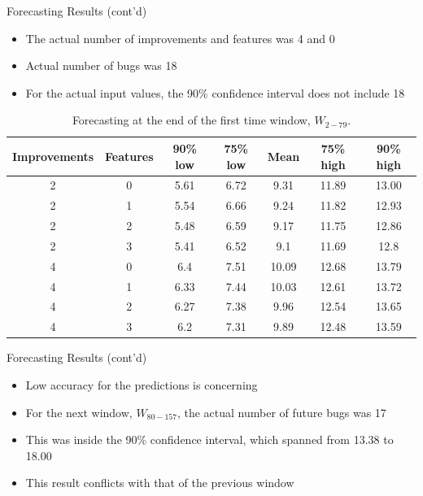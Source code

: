 \documentclass[presentation]{beamer}
\begin{document}
\begin{frame}[t]{Forecasting Results (cont'd)}
\footnotesize{
\begin{itemize}
\item{The actual number of improvements and features was 4 and 0}
\item{Actual number of bugs was 18}
\item{For the actual input values, the 90\% confidence interval does not include 18}
\end{itemize}

\vspace{-.5cm}
\begin{table}[htbp]
  \centering
\caption{Forecasting at the end of the first time window, $W_{2-79}$.}
  \begin{tabular}{ c | c | c | c | c | c | c }
    Improvements & Features & 90\% low & 75\% low & Mean & 75\% high & 90\% high \\
    \hline
2 & 0 & 5.61 & 6.72 & 9.31 & 11.89 & 13.00 \\
2 & 1 & 5.54 & 6.66 & 9.24 & 11.82 & 12.93 \\
2 & 2 & 5.48 & 6.59 & 9.17 & 11.75 & 12.86 \\
2 & 3 & 5.41 & 6.52 & 9.1 & 11.69 & 12.8 \\
4 & 0 & 6.4 & 7.51 & 10.09 & 12.68 & 13.79 \\
4 & 1 & 6.33 & 7.44 & 10.03 & 12.61 & 13.72 \\
4 & 2 & 6.27 & 7.38 & 9.96 & 12.54 & 13.65 \\
4 & 3 & 6.2 & 7.31 & 9.89 & 12.48 & 13.59 \\
    \hline
  \end{tabular}
\end{table}
}
\end{frame}


\begin{frame}[t]{Forecasting Results (cont'd)}
\begin{itemize}
\item{Low accuracy for the predictions is concerning}
\item{For the next window, $W_{80-157}$, the actual number of future bugs was 17}
\item{This was inside the 90\% confidence interval, which spanned from 13.38 to 18.00}
\item{This result conflicts with that of the previous window}
\end{itemize}
\end{frame}
\end{document}

